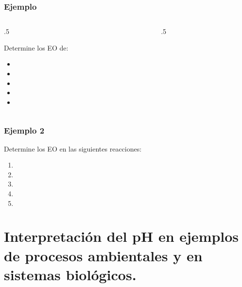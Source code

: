 \documentclass[11pt, aspectratio=169, xcolor=table]{beamer}
\begin{document}
\begin{frame}[allowdisplaybreaks]
	\frametitle{Ejemplo}
	\begin{columns}
		\begin{column}{.5\textwidth}
			\begin{exampleblock}{Determine los EO de:}
				\begin{itemize}
					\item {}
					\item {}
					\item {}
					\item {}
					\item {}
				\end{itemize}
			\end{exampleblock}
		\end{column}

		\begin{column}{.5\textwidth}

		\end{column}
	\end{columns}
\end{frame}

\begin{frame}[allowdisplaybreaks]
	\frametitle{Ejemplo 2}
	\begin{exampleblock}{Determine los EO en las siguientes reacciones:}
		\begin{enumerate}
			\small
			\item {}
			\item {}
			\item {}
			\item {}
			\item {}
		\end{enumerate}
	\end{exampleblock}
\end{frame}

\section{Interpretación del pH en ejemplos de procesos ambientales y en sistemas biológicos.}
\end{document}
